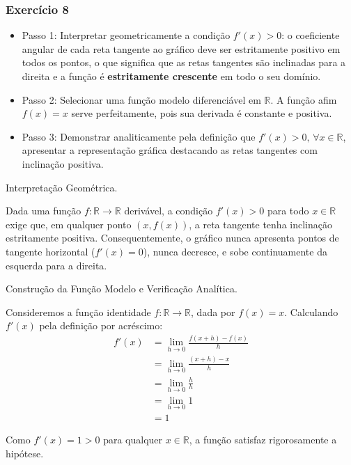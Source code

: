 \subsubsection*{Exercício 8}

\begin{estrategiabox}
  \begin{itemize}[noitemsep, topsep=2pt]
    \item Passo 1: Interpretar geometricamente a condição $f'(x) > 0$: o coeficiente angular de cada reta tangente ao gráfico deve ser estritamente positivo em todos os pontos, o que significa que as retas tangentes são inclinadas para a direita e a função é \textbf{estritamente crescente} em todo o seu domínio.
    \item Passo 2: Selecionar uma função modelo diferenciável em $\mathbb{R}$. A função afim $f(x) = x$ serve perfeitamente, pois sua derivada é constante e positiva.
    \item Passo 3: Demonstrar analiticamente pela definição que $f'(x) > 0, \, \forall x \in \mathbb{R}$, apresentar a representação gráfica destacando as retas tangentes com inclinação positiva.
  \end{itemize}
\end{estrategiabox}

Interpretação Geométrica.

Dada uma função $f:\mathbb{R} \to \mathbb{R}$ derivável, a condição $f'(x) > 0$ para todo $x \in \mathbb{R}$ exige que, em qualquer ponto $(x, f(x))$,
a reta tangente tenha inclinação estritamente positiva. Consequentemente, o gráfico nunca apresenta pontos de tangente horizontal ($f'(x) = 0$),
nunca decresce, e sobe continuamente da esquerda para a direita.

Construção da Função Modelo e Verificação Analítica.

Consideremos a função identidade $f: \mathbb{R} \to \mathbb{R}$, dada por $f(x) = x$. Calculando $f'(x)$ pela definição por acréscimo:
\begin{align*}
f'(x) &= \lim_{h \to 0} \frac{f(x + h) - f(x)}{h} \\
      &= \lim_{h \to 0} \frac{(x + h) - x}{h} \\
      &= \lim_{h \to 0} \frac{h}{h} \\
      &= \lim_{h \to 0} 1 \\
      &= 1
\end{align*}

Como $f'(x) = 1 > 0$ para qualquer $x \in \mathbb{R}$, a função satisfaz rigorosamente a hipótese.

